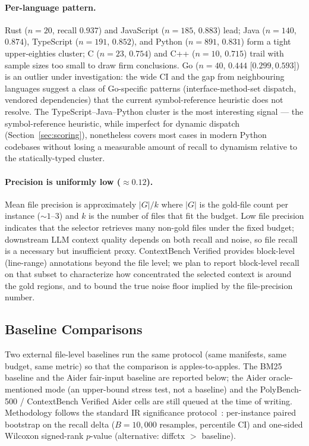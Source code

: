 \documentclass[11pt, a4paper]{article}
\begin{document}
\paragraph{Per-language pattern.} Rust ($n{=}20$, recall $0.937$) and JavaScript ($n{=}185$, $0.883$) lead; Java ($n{=}140$, $0.874$), TypeScript ($n{=}191$, $0.852$), and Python ($n{=}891$, $0.831$) form a tight upper-eighties cluster; C ($n{=}23$, $0.754$) and C++ ($n{=}10$, $0.715$) trail with sample sizes too small to draw firm conclusions. Go ($n{=}40$, $0.444$ [$0.299, 0.593$]) is an outlier under investigation: the wide CI and the gap from neighbouring languages suggest a class of Go-specific patterns (interface-method-set dispatch, vendored dependencies) that the current symbol-reference heuristic does not resolve. The TypeScript--Java--Python cluster is the most interesting signal --- the symbol-reference heuristic, while imperfect for dynamic dispatch (Section~\ref{sec:scoring}), nonetheless covers most cases in modern Python codebases without losing a measurable amount of recall to dynamism relative to the statically-typed cluster.

\paragraph{Precision is uniformly low ($\approx 0.12$).} Mean file precision is approximately $|G|/k$ where $|G|$ is the gold-file count per instance ($\sim 1$--$3$) and $k$ is the number of files that fit the budget. Low file precision indicates that the selector retrieves many non-gold files under the fixed budget; downstream LLM context quality depends on both recall and noise, so file recall is a necessary but insufficient proxy. ContextBench Verified provides block-level (line-range) annotations beyond the file level; we plan to report block-level recall on that subset to characterize how concentrated the selected context is around the gold regions, and to bound the true noise floor implied by the file-precision number.

\subsection{Baseline Comparisons}
\label{sec:prelim-baselines}

Two external file-level baselines run the same protocol (same manifests, same budget, same metric) so that the comparison is apples-to-apples. The BM25 baseline and the Aider fair-input baseline are reported below; the Aider oracle-mentioned mode (an upper-bound stress test, not a baseline) and the PolyBench-500 / ContextBench Verified Aider cells are still queued at the time of writing. Methodology follows the standard IR significance protocol~\cite{smucker2007comparison}: per-instance paired bootstrap on the recall delta ($B{=}10{,}000$ resamples, percentile CI) and one-sided Wilcoxon signed-rank $p$-value (alternative: diffctx $>$ baseline).
\end{document}
